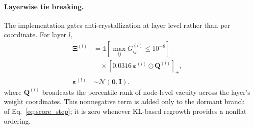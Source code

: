 \documentclass[letterpaper]{article}
\begin{document}
\paragraph{Layerwise tie breaking.}
The implementation gates anti-crystallization at layer level rather than per coordinate. For layer $l$,
\begin{equation}\label{eq:anticryst_exact}
\begin{aligned}
\bm\Xi^{(l)}&=
\mathbb 1\!\left[\max_{ij}G_{ij}^{(l)}\le10^{-8}\right]\\
&\quad\times\left[0.0316\,\bm\varepsilon^{(l)}
\odot\bm Q^{(l)}\right]_+,\\
\bm\varepsilon^{(l)}&\sim\mathcal N(\bm0,\bm I).
\end{aligned}
\end{equation}
where $\bm Q^{(l)}$ broadcasts the percentile rank of node-level vacuity across the layer's weight coordinates. This nonnegative term is added only to the dormant branch of Eq.~\ref{eq:score_step}; it is zero whenever KL-based regrowth provides a nonflat ordering.
\end{document}
